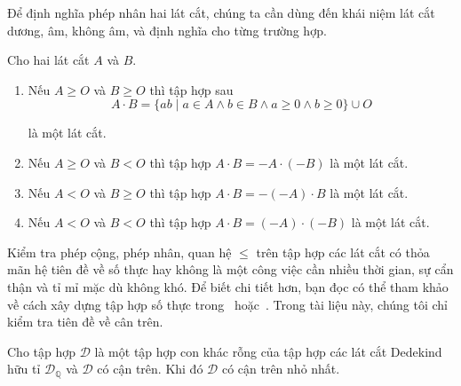 Để định nghĩa phép nhân hai lát cắt, chúng ta cần dùng đến khái niệm lát cắt dương, âm, không âm, và định nghĩa cho từng trường hợp.
\begin{theorem}
    Cho hai lát cắt $A$ và $B$.
    \begin{enumerate}[label={(\roman*)}]
        \item Nếu $A\geq O$ và $B\geq O$ thì tập hợp sau
              \[
                  A\cdot B = \{ ab \mid a\in A\wedge b\in B\wedge a\geq 0\wedge b\geq 0 \} \cup O
              \]

              là một lát cắt.
        \item Nếu $A\geq O$ và $B < O$ thì tập hợp $A\cdot B = -A\cdot (-B)$ là một lát cắt.
        \item Nếu $A < O$ và $B\geq O$ thì tập hợp $A\cdot B = -(-A)\cdot B$ là một lát cắt.
        \item Nếu $A < O$ và $B < O$ thì tập hợp $A\cdot B = (-A)\cdot (-B)$ là một lát cắt.
    \end{enumerate}
\end{theorem}

Kiểm tra phép cộng, phép nhân, quan hệ $\leq$ trên tập hợp các lát cắt có thỏa mãn hệ tiên đề về số thực hay không là một công việc cần nhiều thời gian, sự cẩn thận và tỉ mỉ mặc dù không khó. Để biết chi tiết hơn, bạn đọc có thể tham khảo về cách xây dựng tập hợp số thực trong~\cite{spivak} hoặc~\cite{abbott}. Trong tài liệu này, chúng tôi chỉ kiểm tra tiên đề về cân trên.

\begin{theorem}
    Cho tập hợp $\mathscr{D}$ là một tập hợp con khác rỗng của tập hợp các lát cắt Dedekind hữu tỉ $\mathscr{D}_{\mathbb{Q}}$ và $\mathscr{D}$ có cận trên. Khi đó $\mathscr{D}$ có cận trên nhỏ nhất.
\end{theorem}

